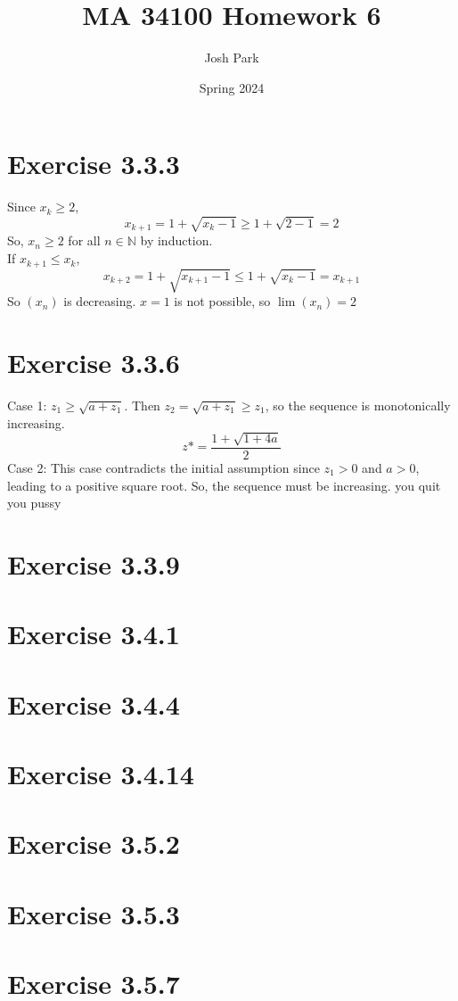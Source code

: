 \documentclass[11pt]{article}
\author{Josh Park}
\date{\vspace{-1em}Spring 2024}
\title{MA 34100 Homework 6\vspace{-1em}}
\newcommand{\N}{\mathbb{N}}  %
\newcommand{\xn}{(x_n)}
\begin{document}
    \maketitle
    \section*{Exercise 3.3.3}
    Since $x_k\geq 2$,
    \[ x_{k+1} = 1 + \sqrt{x_k-1}\geq 1+\sqrt{2-1}=2\]
    So, $x_n\geq 2$ for all $n\in\N$ by induction. \\
    If $x_{k+1}\leq x_k$,
    \[x_{k+2}=1+\sqrt{x_{k+1}-1}\leq 1+\sqrt{x_k-1}=x_{k+1}\]
    So $\xn$ is decreasing. $x=1$ is not possible, so $\lim \xn = 2$

    \section*{Exercise 3.3.6}
    Case 1: $z_1 \geq \sqrt{a+z_1}$. Then $z_2=\sqrt{a+z_1}\geq z_1$, so the sequence is monotonically increasing.
    \[z*=\frac{1+\sqrt{1+4a}}{2}\]
    Case 2:
    This case contradicts the initial assumption since $z_1>0$ and $a>0$, leading to a positive square root. So, the sequence must be increasing.
you quit you pussy

    \section*{Exercise 3.3.9}

    \section*{Exercise 3.4.1}
    \section*{Exercise 3.4.4}
    \section*{Exercise 3.4.14}

    \section*{Exercise 3.5.2}
    \section*{Exercise 3.5.3}
    \section*{Exercise 3.5.7}
\end{document}
